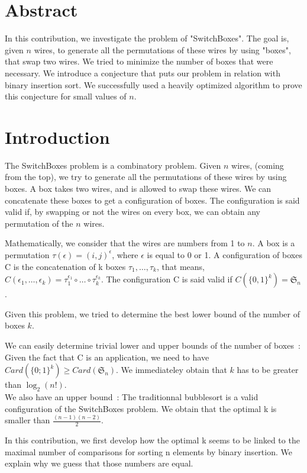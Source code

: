 \documentclass[11pt, a4paper]{article}
\begin{document}
\section{Abstract}

In this contribution, we investigate the problem of "SwitchBoxes".  The goal is,
given $n$ wires, to generate all the permutations of these wires by using
"boxes", that swap two wires. We tried to minimize the number of boxes that were
necessary.  We introduce a conjecture that puts our problem in relation with
binary insertion sort.  We successfully used a heavily optimized algorithm to
prove this conjecture for small values of $n$.

\section{Introduction}

The SwitchBoxes problem is a combinatory problem. Given $n$ wires, (coming from
the top), we try to generate all the permutations of these wires by using boxes.
A box takes two wires, and is allowed to swap these wires. We can concatenate
these boxes to get a configuration of boxes.  The configuration is said valid
if, by swapping or not the wires on every box, we can obtain any permutation of
	the $n$ wires.

Mathematically, we consider that the wires are numbers from 1 to $n$. A box is a
permutation $\tau(\epsilon) = (i,j)^{\epsilon}$, where $\epsilon$ is equal to 0
or 1.  A configuration of boxes C is the concatenation of k boxes $\tau_1,
\ldots, \tau_k$, that means, $C(\epsilon_1, \ldots, \epsilon_k) =
\tau_1^{\epsilon_1}\circ\ldots\circ\tau_k^{\epsilon_k}$.  The configuration C is
said valid if $C(\{0,1\}^k)= \mathfrak{S}_n$.

Given this problem, we tried to determine the best lower bound of the number of
boxes $k$.

We can easily determine trivial lower and upper bounds of the number of
boxes~:\\ Given the fact that C is an application, we need to have
$Card(\{0;1\}^{k}) \geq Card(\mathfrak{S}_n)$. We immediateley obtain that $k$
has to be greater than $\log_2(n!)$.\\ We also have an upper bound~: The
traditionnal bubblesort is a valid configuration of the SwitchBoxes problem. We
obtain that the optimal k is smaller than $\frac{(n-1)(n-2)}{2}$.

In this contribution, we first develop how the optimal k seems to be linked to
the maximal number of comparisons for sorting n elements by binary insertion.
We explain why we guess that those numbers are equal.
\end{document}
